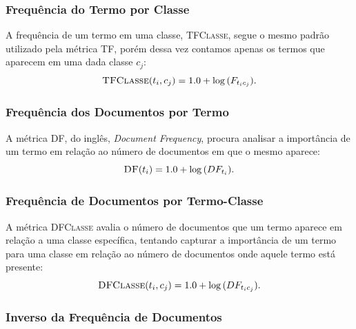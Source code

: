 \subsubsection{Frequência do Termo por Classe} %
\label{subsubsection::tf}

A frequência de um termo em uma classe, \textsc{TFClasse}, segue o mesmo padrão utilizado pela métrica \textsc{TF}, porém dessa vez contamos apenas os termos que aparecem em uma dada classe $c_j$:
\begin{equation}\label{eqn::tf}
  \textsc{TFClasse}(t_i, c_j) = 1.0 + \log{ ( F_{t_ic_j} ) }.
\end{equation}


\subsubsection{Frequência dos Documentos por Termo}%
\label{subsubsection::df}

A métrica \textsc{DF}, do inglês, \textit{Document Frequency}, procura analisar a importância de um termo em relação ao número de documentos em que o mesmo aparece:
\begin{equation}\label{eqn::df}
  \textsc{DF}(t_i) = 1.0 + \log{ ( DF_{t_i} ) }.
\end{equation}



\subsubsection{Frequência de Documentos por Termo-Classe}%
\label{subsubsection::sumdf}

A métrica \textsc{DFClasse} avalia o número de documentos que um termo aparece em relação a uma classe específica, tentando capturar a importância de um termo para uma classe em relação ao número de documentos onde aquele termo está presente:
\begin{equation}\label{eqn::sumtf}
 \textsc{DFClasse}(t_i,c_j) = 1.0 + \log{ ( DF_{t_ic_j} ) }.
\end{equation}


\subsubsection{Inverso da Frequência de Documentos}%
\label{subsubsection::idf}

